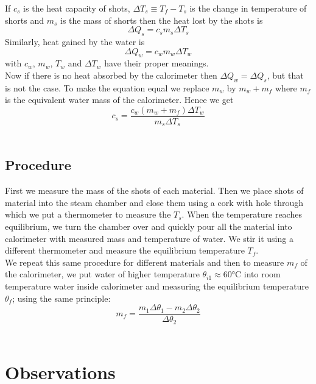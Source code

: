 \documentclass[%
 sor,
 jor,
 amsmath,amssymb,
 reprint,%
]{revtex4-2}
\begin{document}
If $c_s$ is the heat capacity of shots, $\Delta T_s \equiv T_f -T_s$ is the change in temperature of shorts and $m_s$ is the mass of shorts then the heat lost by the shots is
$$\Delta Q_s = c_s m_s \Delta T_s$$
Similarly, heat gained by the water is
$$\Delta Q_w = c_w m_ w\Delta T_w$$
with $c_w$, $m_w$, $T_w$ and $\Delta T_w$ have their proper meanings.  \\ Now if there is no heat absorbed by the calorimeter then $\Delta Q_w = \Delta Q_s$, but that is not the case. To make the equation equal we replace $m_w$ by $m_w+m_f$ where $m_f$ is the equivalent water mass of the calorimeter. Hence we get
\begin{equation}
c_s = \frac{c_w(m_w +m_f)\Delta T_w}{m_s \Delta T_s}
\end{equation} \\

\subsection{Procedure}
First we measure the mass of the shots of each material. Then we place shots of material into the steam chamber and close them using a cork with hole through which we put a thermometer to measure the $T_s$. When the temperature reaches equilibrium, we turn the chamber over and quickly pour all the material into calorimeter with measured mass and temperature of water. We stir it using a different thermometer and measure the equilibrium temperature $T_f$. \\
We repeat this same procedure for different materials and then to measure $m_f$ of the calorimeter, we put water of higher temperature $\theta_{i1} \approx 60$\si{\celsius} into room temperature water inside calorimeter and measuring the equilibrium temperature $\theta_f$; using the same principle:
\begin{equation}
m_f = \frac{m_1\Delta \theta_1 - m_2 \Delta \theta_2}{\Delta \theta_2}
\end{equation} \\

\section{Observations}
\end{document}
